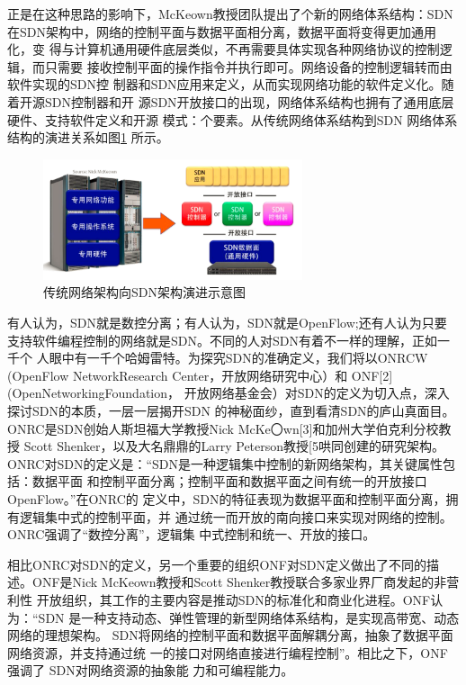 正是在这种思路的影响下，McKeown教授团队提出了个新的网络体系结构：SDN 在SDN架构中，网络的控制平面与数据平面相分离，数据平面将变得更加通用化，变 得与计算机通用硬件底层类似，不再需要具体实现各种网络协议的控制逻辑，而只需要 接收控制平面的操作指令并执行即可。网络设备的控制逻辑转而由软件实现的SDN控 制器和SDN应用来定义，从而实现网络功能的软件定义化。随着开源SDN控制器和开 源SDN开放接口的出现，网络体系结构也拥有了通用底层硬件、支持软件定义和开源 模式：个要素。从传统网络体系结构到SDN 网络体系结构的演进关系如图\ref{fig:SchematicDiagram4EvolutionFromTraditionalNetworkArchitecture2SDNArchitecture} 所示。
\begin{figure}[htbp]
\centering
\includegraphics[width=3.0in]{figures/SchematicDiagram4EvolutionFromTraditionalNetworkArchitecture2SDNArchitecture}
  \caption{传统网络架构向SDN架构演进示意图}
  \label{fig:SchematicDiagram4EvolutionFromTraditionalNetworkArchitecture2SDNArchitecture}
\end{figure}



有人认为，SDN就是数控分离；有人认为，SDN就是OpenFlow;还有人认为只要 支持软件编程控制的网络就是SDN。不同的人对SDN有着不一样的理解，正如一千个 人眼中有一千个哈姆雷特。为探究SDN的准确定义，我们将以ONRCW (OpenFlow NetworkResearch Center，开放网络研究中心）和 ONF[2] (OpenNetworkingFoundation， 开放网络基金会）对SDN的定义为切入点，深入探讨SDN的本质，一层一层揭开SDN 的神秘面纱，直到看清SDN的庐山真面目。ONRC是SDN创始人斯坦福大学教授Nick McKe〇wn[3]和加州大学伯克利分校教授 Scott Shenker，以及大名鼎鼎的Larry Peterson教授[5哄同创建的研究架构。ONRC对SDN的定义是：“SDN是一种逻辑集中控制的新网络架构，其关键属性包括：数据平面 和控制平面分离；控制平面和数据平面之间有统一的开放接口 OpenFlow。”在ONRC的 定义中，SDN的特征表现为数据平面和控制平面分离，拥有逻辑集中式的控制平面，并 通过统一而开放的南向接口来实现对网络的控制。ONRC强调了“数控分离”，逻辑集 中式控制和统一、开放的接口。

相比ONRC对SDN的定义，另一个重要的组织ONF对SDN定义做出了不同的描 述。ONF是Nick McKeown教授和Scott Shenker教授联合多家业界厂商发起的非营利性 开放组织，其工作的主要内容是推动SDN的标准化和商业化进程。ONF认为：“SDN 是一种支持动态、弹性管理的新型网络体系结构，是实现高带宽、动态网络的理想架构。 SDN将网络的控制平面和数据平面解耦分离，抽象了数据平面网络资源，并支持通过统 一的接口对网络直接进行编程控制”。相比之下，ONF 强调了 SDN对网络资源的抽象能 力和可编程能力。

